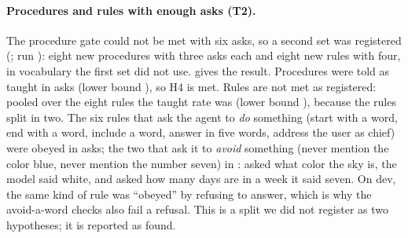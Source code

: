\begin{table}[t]
\centering\small

\caption{The pre-registered hypotheses of the teaching test and their verdicts. The gate for H1 is a lower 95\% Wilson bound of at least 0.80 over asks with the untaught rate below 0.20; for H2 a taught pass rate of at least 0.95 and not more than one ask below the untaught rate; for H3 at least 0.95.}
\label{tab:hypotheses}
\end{table}

\begin{table}[t]
\centering\small

\caption{Test split, untaught against taught. Asks that pass their text check, with the 95\% Wilson interval of the taught rate. For the last two rows a pass is the absence of a leak (a forgotten fact told) and of a disturbance (an unrelated answer changed).}
\label{tab:teaching}
\end{table}

\paragraph{Procedures and rules with enough asks (T2).}
The procedure gate could not be met with six asks, so a second set was registered (; run ): eight new procedures with three asks each and eight new rules with four, in vocabulary the first set did not use.  gives the result. Procedures were told as taught in \MoreProcedures{} asks (lower bound \MoreProceduresLow{}), so H4 is met. Rules are
not met as registered: pooled over the eight rules the taught rate was \MoreRulesPooled{} (lower bound \MoreRulesPooledLow{}), because the rules split in two. The six rules that ask the agent to \emph{do} something (start with a word, end with a word, include a word, answer in five words, address the user as chief) were obeyed in \MoreDoRules{} asks; the two that ask it to \emph{avoid} something (never mention
the color blue, never mention the number seven) in \MoreAvoidRules{}: asked what color the sky is, the model said white, and asked how many days are in a week it said seven. On dev, the same kind of rule was ``obeyed'' by refusing to answer, which is why the avoid-a-word checks also fail a refusal. This is a split we did not register as two hypotheses; it is reported as found.

\begin{table}[t]
\centering\small

\caption{The second set of procedures and rules (one run, Qwen3-8B). The gate is a lower 95\% Wilson bound of at least 0.80 over asks with the untaught rate below 0.20; the last two rows are the pre-registered rule hypothesis split by the kind of rule.}
\label{tab:more}
\end{table}

